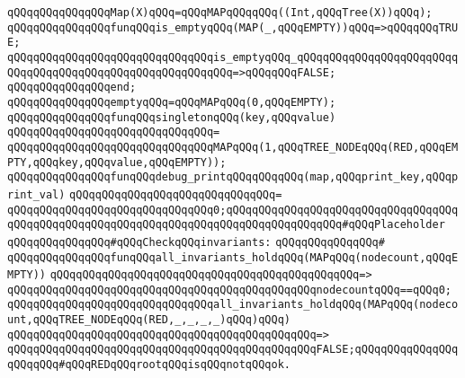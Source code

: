\newline
\verb|qQQqqQQqqQQqqQQqMap(X)qQQq=qQQqMAPqQQqqQQq((Int,qQQqTree(X))qQQq);|\newline
\newline
\verb|qQQqqQQqqQQqqQQqfunqQQqis_emptyqQQq(MAP(_,qQQqEMPTY))qQQq=>qQQqqQQqTRUE;|\newline
\verb|qQQqqQQqqQQqqQQqqQQqqQQqqQQqqQQqis_emptyqQQq_qQQqqQQqqQQqqQQqqQQqqQQqqQQqqQQqqQQqqQQqqQQqqQQqqQQqqQQqqQQq=>qQQqqQQqFALSE;|\newline
\verb|qQQqqQQqqQQqqQQqend;|\newline
\newline
\verb|qQQqqQQqqQQqqQQqemptyqQQq=qQQqMAPqQQq(0,qQQqEMPTY);|\newline
\newline
\verb|qQQqqQQqqQQqqQQqfunqQQqsingletonqQQq(key,qQQqvalue)|\newline
\verb|qQQqqQQqqQQqqQQqqQQqqQQqqQQqqQQq=|\newline
\verb|qQQqqQQqqQQqqQQqqQQqqQQqqQQqqQQqMAPqQQq(1,qQQqTREE_NODEqQQq(RED,qQQqEMPTY,qQQqkey,qQQqvalue,qQQqEMPTY));|\newline
\newline
\verb|qQQqqQQqqQQqqQQqfunqQQqdebug_printqQQqqQQqqQQq(map,qQQqprint_key,qQQqprint_val)|\newline
\verb|qQQqqQQqqQQqqQQqqQQqqQQqqQQqqQQq=|\newline
\verb|qQQqqQQqqQQqqQQqqQQqqQQqqQQqqQQq0;qQQqqQQqqQQqqQQqqQQqqQQqqQQqqQQqqQQqqQQqqQQqqQQqqQQqqQQqqQQqqQQqqQQqqQQqqQQqqQQqqQQqqQQq#qQQqPlaceholder|\newline
\newline
\newline
\verb|qQQqqQQqqQQqqQQq#qQQqCheckqQQqinvariants:|\newline
\verb|qQQqqQQqqQQqqQQq#|\newline
\verb|qQQqqQQqqQQqqQQqfunqQQqall_invariants_holdqQQq(MAPqQQq(nodecount,qQQqEMPTY))|\newline
\verb|qQQqqQQqqQQqqQQqqQQqqQQqqQQqqQQqqQQqqQQqqQQqqQQq=>|\newline
\verb|qQQqqQQqqQQqqQQqqQQqqQQqqQQqqQQqqQQqqQQqqQQqqQQqnodecountqQQq==qQQq0;|\newline
\newline
\verb|qQQqqQQqqQQqqQQqqQQqqQQqqQQqqQQqall_invariants_holdqQQq(MAPqQQq(nodecount,qQQqTREE_NODEqQQq(RED,_,_,_,_)qQQq)qQQq)|\newline
\verb|qQQqqQQqqQQqqQQqqQQqqQQqqQQqqQQqqQQqqQQqqQQqqQQq=>|\newline
\verb|qQQqqQQqqQQqqQQqqQQqqQQqqQQqqQQqqQQqqQQqqQQqqQQqFALSE;qQQqqQQqqQQqqQQqqQQqqQQq#qQQqREDqQQqrootqQQqisqQQqnotqQQqok.|\newline
